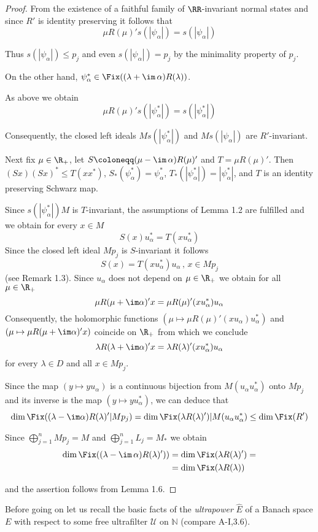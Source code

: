 \begin{proof}
From the existence of a faithful family of $\RR$-invariant normal states and since $R'$ is identity preserving it follows that
\[
\mu R(\mu)'s(|\psi_{\alpha}|) = s(|\psi_{\alpha}|)
\]







Thus $s(|\psi_{\alpha}|) \leq p_{j}$ and even $s(|\psi_{\alpha}|) = p_{j}$ by the minimality property of $p_{j}$.

On the other hand, $\psi_{\alpha}^{*} \in \Fix((\lambda + \im\,\alpha)R(\lambda))$.

As above we obtain
\[
\mu R(\mu)'s(|\psi_{\alpha}^{*}|) = s(|\psi_{\alpha}^{*}|)
\]

Consequently, the closed left ideals $Ms(|\psi_{\alpha}^{*}|)$ and $Ms(|\psi_{\alpha}|)$ are $R'$-invariant.

Next fix $\mu \in \R_{+}$, let $S \coloneqq (\mu - \im\,\alpha)R(\mu)'$ and $T = \mu R(\mu)'$.
Then $(Sx)(Sx)^{*} \leq T(xx^{*})$, $S_{*}(\psi_{\alpha}^{*}) = \psi_{\alpha}^{*}$, $T_{*}(|\psi_{\alpha}^{*}|) = |\psi_{\alpha}^{*}|$, and $T$ is an identity preserving Schwarz map.

Since $s(|\psi_{\alpha}^{*}|)M$ is $T$-invariant, the assumptions of Lemma 1.2 are fulfilled and we obtain for every $x \in M$
\[
S(x)u_{\alpha}^{*} = T(xu_{\alpha}^{*})
\]
Since the closed left ideal $Mp_{j}$ is $S$-invariant it follows
\[
S(x) = T(xu_{\alpha}^{*})u_{\alpha} \, , \, x \in Mp_{j}
\]
(see Remark 1.3).
Since $u_{\alpha}$ does not depend on $\mu \in \R_{+}$ we obtain for all $\mu \in \R_{+}$
\[
\mu R(\mu+\im\alpha)'x = \mu R(\mu)'(xu_{\alpha}^{*})u_{\alpha}
\]
Consequently, the holomorphic functions $(\mu \mapsto \mu R(\mu)'(xu_{\alpha})u_{\alpha}^{*})$ and $(\mu \mapsto \mu R(\mu+\im\alpha)'x)$ coincide on $\R_{+}$ from which we conclude
\[
\lambda R(\lambda+\im\alpha)'x = \lambda R(\lambda)'(xu_{\alpha}^{*})u_{\alpha}
\]
for every $\lambda \in D$ and all $x \in Mp_{j}$.

Since the map $(y \mapsto yu_{\alpha})$ is a continuous bijection from $M(u_{\alpha}u_{\alpha}^{*})$ onto $Mp_{j}$ and its inverse is the map $(y \mapsto yu_{\alpha}^{*})$, we can deduce that
\[
\dim \Fix((\lambda-\im\alpha)R(\lambda)'|Mp_{j}) = \dim \Fix(\lambda R(\lambda)')|M(u_{\alpha}u_{\alpha}^{*}) \leq \dim \Fix(R')
\]

Since $\bigoplus_{j=1}^{n} Mp_{j} = M$ and $\bigoplus_{j=1}^{n} L_{j} = M_{*}$ we obtain
\begin{align*}
\dim \Fix((\lambda - \im\,\alpha)R(\lambda)')) &= \dim \Fix(\lambda R(\lambda)') = \\
&= \dim \Fix(\lambda R(\lambda))
\end{align*}






and the assertion follows from Lemma 1.6.
\end{proof}
Before going on let us recall the basic facts of the \emph{ultrapower} $\hat{E}$ of a Banach space $E$ with respect to some free ultrafilter $\mathcal{U}$ on $\mathbb{N}$ (compare A-I,3.6).

